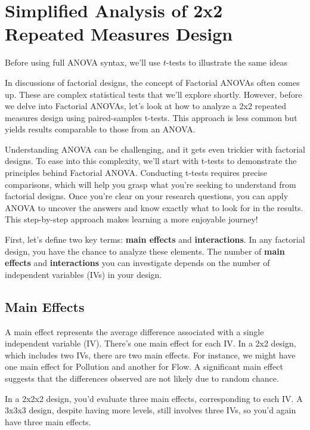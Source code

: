 \documentclass[
  letterpaper,
  DIV=11,
  numbers=noendperiod]{scrreprt}
\begin{document}
\section{Simplified Analysis of 2x2 Repeated Measures
Design}\label{simplified-analysis-of-2x2-repeated-measures-design}

Before using full ANOVA syntax, we'll use \(t\)-tests to illustrate the
same ideas

In discussions of factorial designs, the concept of Factorial ANOVAs
often comes up. These are complex statistical tests that we'll explore
shortly. However, before we delve into Factorial ANOVAs, let's look at
how to analyze a 2x2 repeated measures design using paired-samples
t-tests. This approach is less common but yields results comparable to
those from an ANOVA.

Understanding ANOVA can be challenging, and it gets even trickier with
factorial designs. To ease into this complexity, we'll start with
t-tests to demonstrate the principles behind Factorial ANOVA. Conducting
t-tests requires precise comparisons, which will help you grasp what
you're seeking to understand from factorial designs. Once you're clear
on your research questions, you can apply ANOVA to uncover the answers
and know exactly what to look for in the results. This step-by-step
approach makes learning a more enjoyable journey!

First, let's define two key terms: \textbf{main effects} and
\textbf{interactions}. In any factorial design, you have the chance to
analyze these elements. The number of \textbf{main effects} and
\textbf{interactions} you can investigate depends on the number of
independent variables (IVs) in your design.

\subsection{Main Effects}\label{main-effects}

A main effect represents the average difference associated with a single
independent variable (IV). There's one main effect for each IV. In a 2x2
design, which includes two IVs, there are two main effects. For
instance, we might have one main effect for Pollution and another for
Flow. A significant main effect suggests that the differences observed
are not likely due to random chance.

In a 2x2x2 design, you'd evaluate three main effects, corresponding to
each IV. A 3x3x3 design, despite having more levels, still involves
three IVs, so you'd again have three main effects.
\end{document}
